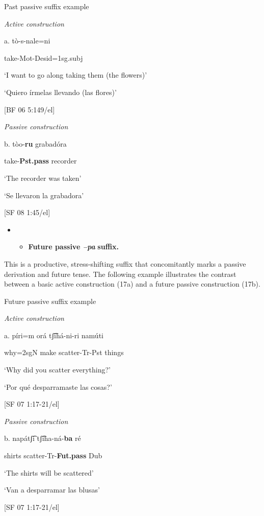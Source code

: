    Past passive suffix example

    \textit{Active construction}

a.  tò-s-nale=ni          

take-Mot-Desid=1sg.subj

‘I want to go along taking them (the flowers)’

‘Quiero írmelas llevando (las flores)’      

[BF 06 5:149/el]

    \textit{Passive construction}

  b.  tòo-\textbf{ru}    grabadóra

    take-\textbf{Pst.pass}  recorder

    ‘The recorder was taken’

    ‘Se llevaron la grabadora’        

    [SF 08 1:45/el]

\begin{itemize}
\item \begin{itemize}
\item \textbf{Future passive \textit{–pa} }\textbf{suffix.}
\end{itemize}
\end{itemize}

This is a productive, stress-shifting suffix that concomitantly marks a passive derivation and future tense. The following example illustrates the contrast between a basic active construction (17a) and a future passive construction (17b).


   Future passive suffix example

  \textit{Active construction}

a.   píri=m    orá  tʃ͡ihá-ni-ri  namúti

why=2sgN  make  scatter-Tr-Pst  things

‘Why did you scatter everything?’

‘Por qué desparramaste las cosas?’      

[SF 07 1:17-21/el]

  \textit{Passive construction}

b.   napátʃ͡i  tʃ͡iha-ná-\textbf{ba}    ré

shirts  scatter-Tr-\textbf{Fut.pass}  Dub

‘The shirts will be scattered’  

‘Van a desparramar las blusas’      

[SF 07 1:17-21/el]  


